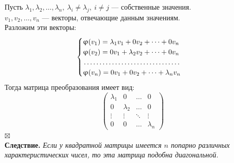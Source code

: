 \documentclass[a4paper, 12pt]{article}
\newenvironment{Proof}
{\par\noindent{$\blacklozenge$}}
{\hfill$\scriptstyle\boxtimes$}
\renewcommand{\varphi}{\upvarphi}
\begin{document}
    \begin{Proof}
    Пусть $\lambda_1, \lambda_2, \dots, \lambda_n, \ \lambda_i \neq \lambda_j, \ i \neq j$ --- собственные значения.\\
    $v_1, v_2, \dots, v_n$ --- векторы, отвечающие данным значениям.\\
    Разложим эти векторы:
    $$\begin{cases}
           \varphi(v_1)=\lambda_1v_1+0v_2+\dots+0v_n\\
           \varphi(v_2)=0v_1+\lambda_2v_2+\dots+0v_n\\
           \dotfill\\
           \varphi(v_n)=0v_1+0v_2+\dots+\lambda_nv_n\\
    \end{cases}$$
    Тогда матрица преобразования имеет вид:
    $$\begin{pmatrix}
    \lambda_1 & 0 & \dots & 0\\
    0 & \lambda_2 & \dots & 0\\
    \vdots & \vdots & \ddots & \vdots\\
    0 & 0 & \dots & \lambda_n
    \end{pmatrix}$$
    \end{Proof}\\
    \textbf{Следствие.} \textit{Если у квадратной матрицы имеется $n$ попарно различных характеристических чисел, то эта матрица подобна диагональной.}
\end{document}
